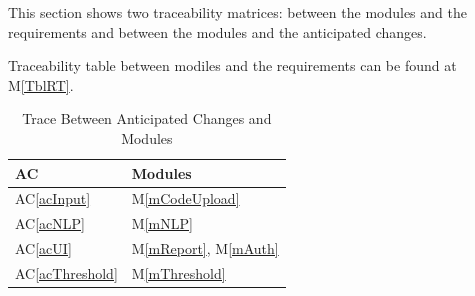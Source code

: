 \documentclass[12pt, titlepage]{article}
\newcommand{\acref}[1]{AC\ref{#1}}
\newcommand{\mref}[1]{M\ref{#1}}
\begin{document}
This section shows two traceability matrices: between the modules and the
requirements and between the modules and the anticipated changes.

Traceability table between modiles and the requirements can be found at \mref{TblRT}. \\

\begin{table}[H]
  \centering
  \begin{tabular}{p{} p{}}
  \toprule
  \textbf{AC} & \textbf{Modules}\\
  \midrule
  \acref{acInput} & \mref{mCodeUpload} \\
  \acref{acNLP} & \mref{mNLP} \\
  \acref{acUI} & \mref{mReport}, \mref{mAuth} \\
  \acref{acThreshold} & \mref{mThreshold} \\
  \bottomrule
  \end{tabular}
  \caption{Trace Between Anticipated Changes and Modules}
  \label{TblACT}
\end{table}
\end{document}
